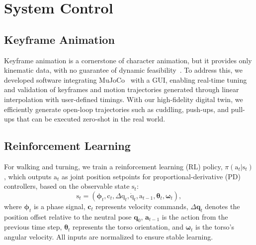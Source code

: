 \section{System Control}
\label{sec:control}

\subsection{Keyframe Animation}

Keyframe animation is a cornerstone of character animation, but it provides only kinematic data, with no guarantee of dynamic feasibility~\citep{izani2003keyframe}. To address this, we developed software integrating MuJoCo~\citep{todorov2012mujoco} with a GUI, enabling real-time tuning and validation of keyframes and motion trajectories generated through linear interpolation with user-defined timings. With our high-fidelity digital twin, we efficiently generate open-loop trajectories such as cuddling, push-ups, and pull-ups that can be executed zero-shot in the real world.

\subsection{Reinforcement Learning}


For walking and turning, we train a reinforcement learning (RL) policy, $\pi(\bm{\mathrm{a}}_t | \bm{\mathrm{s}}_t)$, which outputs $\bm{\mathrm{a}}_t$ as joint position setpoints for proportional-derivative (PD) controllers, based on the observable state $\bm{\mathrm{s}}_t$:
\begin{equation}
\bm{\mathrm{s}}_t = \left(\bm{\phi}_t, \bm{\mathrm{c}}_t, \Delta\bm{\mathrm{q}}_t, \bm{\dot{\mathrm{q}}}_t, \bm{\mathrm{a}}_{t-1}, \bm{\theta}_t, \bm{\omega}_t \right),
\end{equation}
where $\bm{\phi}_t$ is a phase signal, $\bm{c}_t$ represents velocity commands, $\Delta\bm{q}_t$ denotes the position offset relative to the neutral pose $\bm{q}_0$, $\bm{a}_{t-1}$ is the action from the previous time step, $\bm{\theta}_t$ represents the torso orientation, and $\bm{\omega}_t$ is the torso’s angular velocity. All inputs are normalized to ensure stable learning.

